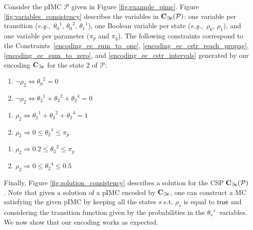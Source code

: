 \documentclass{llncs}
\newcommand{\mc}{\textnormal{MC}}
\newcommand{\pimc}{\textnormal{pIMC}}
\newcommand{\csp}{\textnormal{CSP}}
\newcommand{\Mec} {\ensuremath{{\bf C_{{\exists}c}}}}
\newcommand{\eg} {{\em e.g.},\ }
\newcommand{\ttransition}[1]{\ensuremath{\theta_{#1}}}
\newcommand{\transition}[2]{\ensuremath{\ttransition{#1}^{#2}}}
\newcommand{\true}             {\ensuremath{\mathsf{true}}}
\begin{document}
\begin{example}\label{ex:model_consistency} Consider the {\pimc} $\mathcal{P}$ given in Figure \ref{fig:example_pimc}.
Figure \ref{fig:variables_consistency} describes the variables in $\Mec(\mathcal{P})$:
one variable per transition 
(\eg $\transition{0}{1}$, $\transition{0}{2}$, $\transition{1}{1}$), 
one Boolean variable per state
(\eg $\rho_0$, $\rho_1$), 
and one variable per parameter ($\pi_p$ and $\pi_q$).
The following constraints
correspond to the Constraints~\ref{encoding_ec_sum_to_one}, \ref{encoding_ec_cstr_reach_propag}, \ref{encoding_ec_sum_to_zero}, and \ref{encoding_ec_cstr_intervals} generated by our encoding $\Mec$
for the state $2$ of $\mathcal{P}$:

\hspace*{-0.7cm}
\begin{minipage}[t]{.34\textwidth}
\begin{enumerate}
	\item[]	$\neg \rho_2 \Leftrightarrow \transition{0}{2}  = 0$
	\item[] $\neg \rho_2 \Leftrightarrow \transition{2}{1} + \transition{2}{2} + \transition{2}{4} = 0$
\end{enumerate}
\end{minipage}
\begin{minipage}[t]{.32\textwidth}
\begin{enumerate}
	\item[] $\rho_2 \Leftrightarrow \transition{2}{1} + \transition{2}{2} + \transition{2}{4} = 1$
    \item[] $\rho_2 \Rightarrow 0 \leq \transition{2}{1} \leq \pi_p$
\end{enumerate}
\end{minipage}
\begin{minipage}[t]{.32\textwidth}
\begin{enumerate}
	\item[] $\rho_2 \Rightarrow 0.2 \leq \transition{2}{2} \leq \pi_p$
	\item[] $\rho_2 \Rightarrow 0 \leq \transition{2}{4} \leq 0.5$
\end{enumerate}
\end{minipage}
\end{example}

Finally, Figure \ref{fig:solution_consistency} describes a solution for the {\csp} $\Mec(\mathcal{P})$.
Note that given a solution of a {\pimc} encoded by $\Mec$,
one can construct a {\mc} satisfying the given {\pimc}
by keeping all the states $s$ s.t. $\rho_s$ is equal to {\true} and
considering the transition function given by the probabilities in the
$\transition{s}{s^\prime}$ variables. We now show that
our encoding works as expected.
\end{document}

